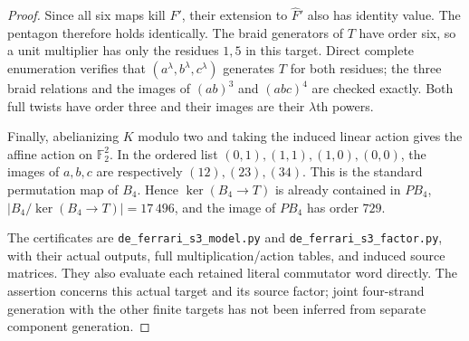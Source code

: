 \begin{proof}
Since all six maps kill $F'$, their extension to $\widehat F'$
also has identity value. The pentagon therefore holds identically.
The braid generators of $T$ have order six, so a unit multiplier
has only the residues $1,5$ in this target. Direct complete
enumeration verifies that $(a^\lambda,b^\lambda,c^\lambda)$
generates $T$ for both residues; the three braid relations and
the images of $(ab)^3$ and $(abc)^4$ are checked exactly.
Both full twists have order three and their images are their
$\lambda$th powers.

Finally, abelianizing $K$ modulo two and taking the induced linear
action gives the affine action on $\mathbb F_2^2$. In the ordered
list $(0,1),(1,1),(1,0),(0,0)$, the images of $a,b,c$ are respectively
$(12),(23),(34)$. This is the standard permutation map of $B_4$.
Hence $\ker(B_4\to T)$ is already contained in $PB_4$,
$|B_4/\ker(B_4\to T)|=17\,496$, and the image of $PB_4$ has order
$729$.

The certificates are \texttt{de\_ferrari\_s3\_model.py} and
\texttt{de\_ferrari\_s3\_factor.py}, with their actual outputs,
full multiplication/action tables, and induced source matrices.
They also evaluate each retained literal commutator word directly.
The assertion concerns this actual target and its source factor;
joint four-strand generation with the other finite targets has
not been inferred from separate component generation.
\end{proof}
